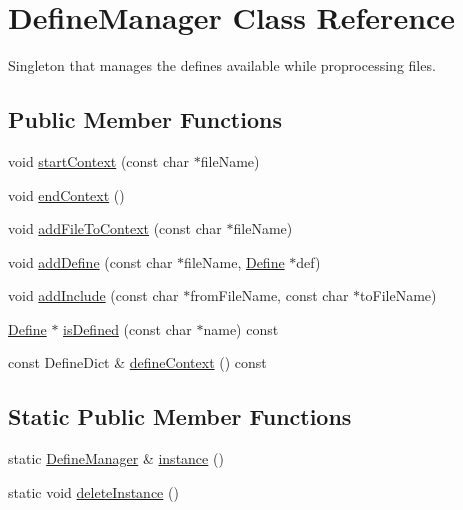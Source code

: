 \hypertarget{class_define_manager}{}\section{Define\+Manager Class Reference}
\label{class_define_manager}


Singleton that manages the defines available while proprocessing files.  


\subsection*{Public Member Functions}
\begin{DoxyCompactItemize}
\item 
void \mbox{\hyperlink{class_define_manager_afbecee8baeba40d35a068f7f3e53fe3e}{start\+Context}} (const char $\ast$file\+Name)
\item 
void \mbox{\hyperlink{class_define_manager_aee1f4c46242ef774c2bb68fb546df57d}{end\+Context}} ()
\item 
void \mbox{\hyperlink{class_define_manager_a9398543779e313d7fee799d200d2054b}{add\+File\+To\+Context}} (const char $\ast$file\+Name)
\item 
void \mbox{\hyperlink{class_define_manager_add50ce745af761cdf1d05428855ada2c}{add\+Define}} (const char $\ast$file\+Name, \mbox{\hyperlink{class_define}{Define}} $\ast$def)
\item 
void \mbox{\hyperlink{class_define_manager_ad7fc54954b0c4e8896354bcf5449c188}{add\+Include}} (const char $\ast$from\+File\+Name, const char $\ast$to\+File\+Name)
\item 
\mbox{\hyperlink{class_define}{Define}} $\ast$ \mbox{\hyperlink{class_define_manager_adcbecf8890431621db6eacc7f6ac8b3d}{is\+Defined}} (const char $\ast$name) const
\item 
const Define\+Dict \& \mbox{\hyperlink{class_define_manager_a6cf93557f46a0954b771af4f21acba6a}{define\+Context}} () const
\end{DoxyCompactItemize}
\subsection*{Static Public Member Functions}
\begin{DoxyCompactItemize}
\item 
static \mbox{\hyperlink{class_define_manager}{Define\+Manager}} \& \mbox{\hyperlink{class_define_manager_abadbf233461748c2d5f037874c58c375}{instance}} ()
\item 
static void \mbox{\hyperlink{class_define_manager_ad3ccd619d92e9bd8e7e7357c6db68cbb}{delete\+Instance}} ()
\end{DoxyCompactItemize}
